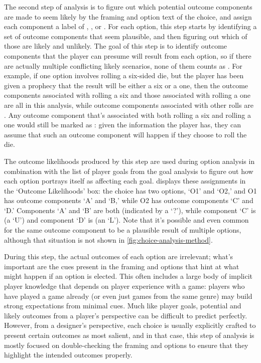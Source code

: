 \label{sec:cp-likelihood-analysis}

The second step of analysis is to figure out which potential outcome components are made to seem likely by the framing and option text of the choice, and assign each component a label of , , or .
%
For each option, this step starts by identifying a set of outcome components that seem plausible, and then figuring out which of those are likely and unlikely.
%
The goal of this step is to identify outcome components that the player can presume will result from each option, so if there are actually multiple conflicting likely scenarios, none of them counts as .
%
For example, if one option involves rolling a six-sided die, but the player has been given a prophecy that the result will be either a six or a one, then the outcome components associated with rolling a six and those associated with rolling a one are all  in this analysis, while outcome components associated with other rolls are . 
%
Any outcome component that's associated with both rolling a six and rolling a one would still be marked as : given the information the player has, they can assume that such an outcome component will happen if they choose to roll the die.


The outcome likelihoods produced by this step are used during option analysis in combination with the list of player goals from the goal analysis to figure out how each option portrays itself as affecting each goal.
%
 displays these assignments in the `Outcome Likelihoods' box: the choice has two options, `O1' and `O2,' and O1 has outcome components `A' and `B,' while O2 has outcome components `C' and `D.'
%
Components `A' and `B' are both  (indicated by a `?'), while component `C' is  (a `U') and component `D' is  (an `L').
%
Note that it's possible and even common for the same outcome component to be a plausible result of multiple options, although that situation is not shown in \cref{fig:choice-analysis-method}.


During this step, the actual outcomes of each option are irrelevant; what's important are the cues present in the framing and options that hint at what might happen if an option is elected.
%
This often includes a large body of implicit player knowledge that depends on player experience with a game: players who have played a game already (or even just games from the same genre) may build strong expectations from minimal cues.
%
Much like player goals, potential and likely outcomes from a player's perspective can be difficult to predict perfectly.
%
However, from a designer's perspective, each choice is usually explicitly crafted to present certain outcomes as most salient, and in that case, this step of analysis is mostly focused on double-checking the framing and options to ensure that they highlight the intended outcomes properly.



